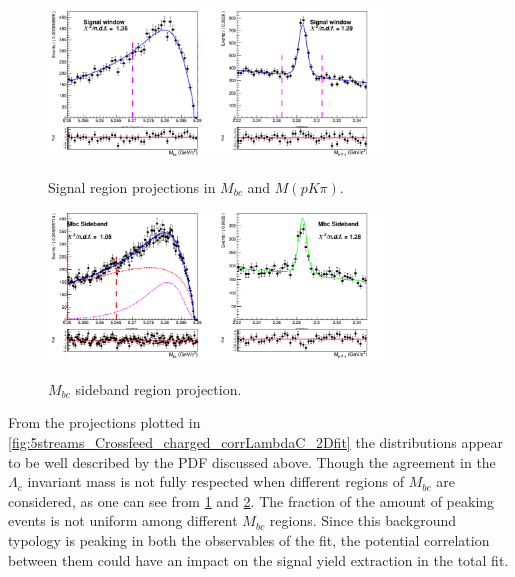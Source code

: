 \begin{figure}[h!]
{\includegraphics[width=0.8\textwidth]{04-chargedCorrBtoLambda/figs/Signal_window_stream12345_Crossfeed_charged_corrLambdaC_2Dfit.png}}
\caption{Signal region projections in $M_{bc}$ and $M(p K \pi)$. }
\label{fig:5streams_Signal_window_Crossfeed_charged_corrLambdaC_2Dfit}
\end{figure}

\begin{figure}[h!]
{\includegraphics[width=0.8\textwidth]{04-chargedCorrBtoLambda/figs/Mbc_Sideband_stream12345_Crossfeed_charged_corrLambdaC_2Dfit.png}}
\caption{$M_{bc}$ sideband region projection. }
\label{fig:5streams_Mbc_Sideband_Crossfeed_charged_corrLambdaC_2Dfit}
\end{figure}

\noindent From the projections plotted in \cref{fig:5streams_Crossfeed_charged_corrLambdaC_2Dfit} the distributions appear to be well described by the PDF discussed above.
Though the agreement in the $\Lambda_c$ invariant mass is not fully respected when different regions of $M_{bc}$ are considered, as one can see from \cref{fig:5streams_Signal_window_Crossfeed_charged_corrLambdaC_2Dfit} and 
\cref{fig:5streams_Mbc_Sideband_Crossfeed_charged_corrLambdaC_2Dfit}. The fraction of the amount of peaking events is not uniform among different $M_{bc}$ regions. Since this background typology is peaking in both the observables of the fit, the potential correlation between them could have an impact on the signal yield extraction in the total fit. 

